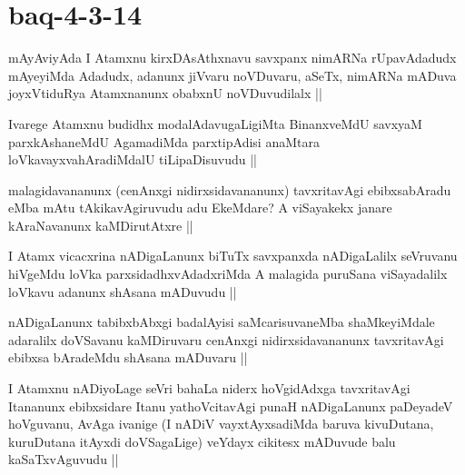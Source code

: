 \section*{baq-4-3-14}


\begin{artha}
mAyAviyAda I Atamxnu kirxDAsAthxnavu savxpanx nimARNa rUpavAdadudx mAyeyiMda Adadudx, adanunx jiVvaru noVDuvaru, aSeTx, nimARNa mADuva joyxVtiduRya Atamxnanunx obabxnU noVDuvudilalx ||
\end{artha}

\begin{artha}
Ivarege Atamxnu budidhx modalAdavugaLigiMta BinanxveMdU savxyaM parxkAshaneMdU AgamadiMda parxtipAdisi anaMtara loVkavayxvahAradiMdalU tiLipaDisuvudu ||
\end{artha}


\begin{artha}
malagidavananunx (cenAnxgi nidirxsidavananunx) tavxritavAgi ebibxsabAradu eMba mAtu tAkikavAgiruvudu adu EkeMdare? A viSayakekx janare kAraNavanunx kaMDirutAtxre ||
\end{artha}


\begin{artha}
I Atamx vicacxrina nADigaLanunx biTuTx savxpanxda nADigaLalilx seVruvanu hiVgeMdu loVka parxsidadhxvAdadxriMda A malagida puruSana viSayadalilx loVkavu adanunx shAsana mADuvudu || 
\end{artha}


\begin{artha}
nADigaLanunx tabibxbAbxgi badalAyisi saMcarisuvaneMba shaMkeyiMdale adaralilx doVSavanu kaMDiruvaru cenAnxgi nidirxsidavananunx tavxritavAgi ebibxsa bAradeMdu shAsana mADuvaru ||
\end{artha}


\begin{artha}
I Atamxnu nADiyoLage seVri bahaLa niderx hoVgidAdxga tavxritavAgi Itananunx ebibxsidare Itanu yathoVcitavAgi punaH nADigaLanunx paDeyadeV hoVguvanu, AvAga ivanige (I nADiV vayxtAyxsadiMda baruva kivuDutana, kuruDutana itAyxdi doVSagaLige) veYdayx cikitesx mADuvude balu kaSaTxvAguvudu ||
\end{artha}

